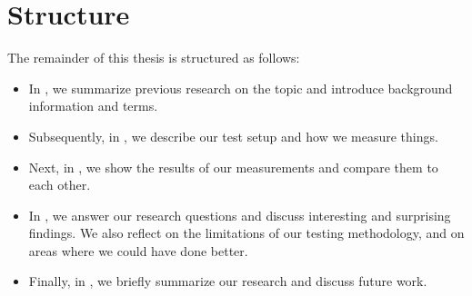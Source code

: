 \section{Structure}
The remainder of this thesis is structured as follows:
\begin{itemize}
  \item In , we summarize previous research on the topic and introduce background information and terms.
  \item Subsequently, in , we describe our test setup and how we measure things.
  \item Next, in , we show the results of our measurements and compare them to each other.
  \item In , we answer our research questions and discuss interesting and surprising findings.
  We also reflect on the limitations of our testing methodology, and on areas where we could have done better.
  \item Finally, in , we briefly summarize our research and discuss future work.
\end{itemize}
